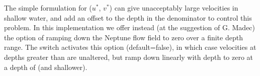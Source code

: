 The simple formulation for ($u^*$, $v^*$) can give unacceptably large velocities
in shallow water, and \citep{HollowayOM08} add an offset to the depth in the
denominator to control this problem. In this implementation we offer instead (at
the suggestion of G. Madec) the option of ramping down the Neptune flow field to
zero over a finite depth range. The switch  activates this
option (default=false), in which case velocities at depths greater than
 are unaltered, but ramp down linearly with depth to zero at a
depth of  (and shallower).

